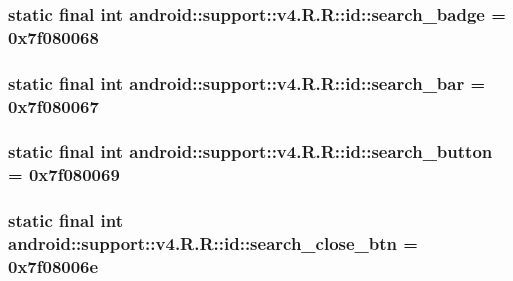 \hypertarget{classandroid_1_1support_1_1v4_1_1_r_1_1id_3ccdbc877845c96b4f1ede6a9fc0ce07}{
\subsubsection[{search\_\-badge}]{\setlength{\rightskip}{0pt plus 5cm}static final int android::support::v4.R.R::id::search\_\-badge = 0x7f080068}}
\label{classandroid_1_1support_1_1v4_1_1_r_1_1id_3ccdbc877845c96b4f1ede6a9fc0ce07}


\hypertarget{classandroid_1_1support_1_1v4_1_1_r_1_1id_fe24f5bb3556268ae1715b928632a3c8}{
\subsubsection[{search\_\-bar}]{\setlength{\rightskip}{0pt plus 5cm}static final int android::support::v4.R.R::id::search\_\-bar = 0x7f080067}}
\label{classandroid_1_1support_1_1v4_1_1_r_1_1id_fe24f5bb3556268ae1715b928632a3c8}


\hypertarget{classandroid_1_1support_1_1v4_1_1_r_1_1id_1eeffa2da4dfc6995d6e3953051a6c70}{
\subsubsection[{search\_\-button}]{\setlength{\rightskip}{0pt plus 5cm}static final int android::support::v4.R.R::id::search\_\-button = 0x7f080069}}
\label{classandroid_1_1support_1_1v4_1_1_r_1_1id_1eeffa2da4dfc6995d6e3953051a6c70}


\hypertarget{classandroid_1_1support_1_1v4_1_1_r_1_1id_c048a9cdcb3a508d01051dc193d63f5d}{
\subsubsection[{search\_\-close\_\-btn}]{\setlength{\rightskip}{0pt plus 5cm}static final int android::support::v4.R.R::id::search\_\-close\_\-btn = 0x7f08006e}}
\label{classandroid_1_1support_1_1v4_1_1_r_1_1id_c048a9cdcb3a508d01051dc193d63f5d}



